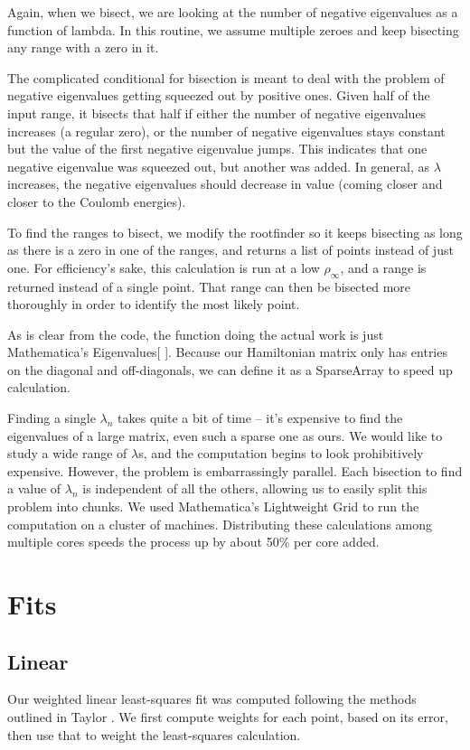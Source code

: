 \documentclass[12pt,twoside]{reedthesis}
\begin{document}
Again, when we bisect, we are looking at the number of negative eigenvalues as a function of lambda. In this routine, we assume multiple zeroes and keep bisecting any range with a zero in it.

The complicated conditional for bisection is meant to deal with the problem of negative eigenvalues getting squeezed out by positive ones. Given half of the input range, it bisects that half if either the number of negative eigenvalues increases (a regular zero), or the number of negative eigenvalues stays constant but the value of the first negative eigenvalue jumps. This indicates that one negative eigenvalue was squeezed out, but another was added. In general, as $\lambda$ increases, the negative eigenvalues should decrease in value (coming closer and closer to the Coulomb energies). 

To find the ranges to bisect, we modify the rootfinder so it keeps bisecting as long as there is a zero in one of the ranges, and returns a list of points instead of just one. For efficiency's sake, this calculation is run at a low $\rho_{\infty}$, and a range is returned instead of a single point. That range can then be bisected more thoroughly in order to identify the most likely point. 

As is clear from the code, the function doing the actual work is just Mathematica's Eigenvalues[ ]. Because our Hamiltonian matrix only has entries on the diagonal and off-diagonals, we can define it as a SparseArray to speed up calculation. 

Finding a single $\lambda_{n}$ takes quite a bit of time -- it's expensive to find the eigenvalues of a large matrix, even such a sparse one as ours. We would like to study a wide range of $\lambda$s, and the computation begins to look prohibitively expensive. However, the problem is embarrassingly parallel. Each bisection to find a value of $\lambda_n$ is independent of all the others, allowing us to easily split this problem into chunks. We used Mathematica's Lightweight Grid to run the computation on a cluster of machines. Distributing these calculations among multiple cores speeds the process up by about 50\% per core added. 

\section{Fits}
\subsection{Linear}
Our weighted linear least-squares fit was computed following the methods outlined in Taylor \cite{taylor_introduction_1997}. We first compute weights for each point, based on its error, then use that to weight the least-squares calculation.
\end{document}
